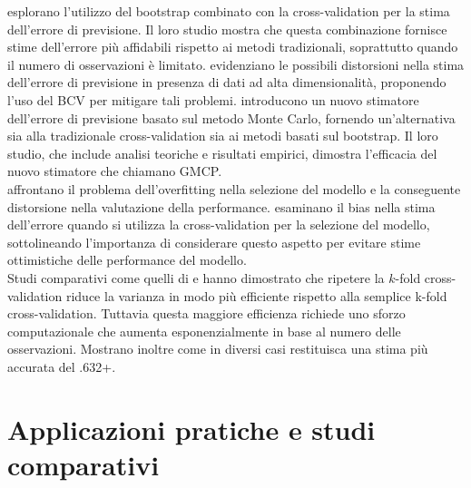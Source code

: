 \textcite{Fuetal} esplorano l'utilizzo del bootstrap combinato con la cross-validation per la stima dell'errore di previsione. Il loro studio mostra che questa combinazione fornisce stime dell'errore più affidabili rispetto ai metodi tradizionali, soprattutto quando il numero di osservazioni è limitato. \textcite{vansanden} evidenziano le possibili distorsioni nella stima dell'errore di previsione in presenza di dati ad alta dimensionalità, proponendo l'uso del BCV per mitigare tali problemi. \textcite{hefny} introducono un nuovo stimatore dell'errore di previsione basato sul metodo Monte Carlo, fornendo un'alternativa sia alla tradizionale cross-validation sia ai metodi basati sul bootstrap. Il loro studio, che include analisi teoriche e risultati empirici, dimostra l'efficacia del nuovo stimatore che chiamano GMCP.\\
\textcite{cawley} affrontano il problema dell'overfitting nella selezione del modello e la conseguente distorsione nella valutazione della performance. \textcite{varma} esaminano il bias nella stima dell'errore quando si utilizza la cross-validation per la selezione del modello, sottolineando l'importanza di considerare questo aspetto per evitare stime ottimistiche delle performance del modello.\\
Studi comparativi come quelli di \textcite{wongTT} e \textcite{kim2009} hanno dimostrato che ripetere la  $k$-fold cross-validation riduce la varianza in modo più efficiente rispetto alla semplice k-fold cross-validation. Tuttavia questa maggiore efficienza richiede uno sforzo computazionale che aumenta esponenzialmente in base al numero delle osservazioni. Mostrano inoltre come in diversi casi restituisca una stima più accurata del .632+.


\section{Applicazioni pratiche e studi comparativi}
\label{sec:sezione7.5}


